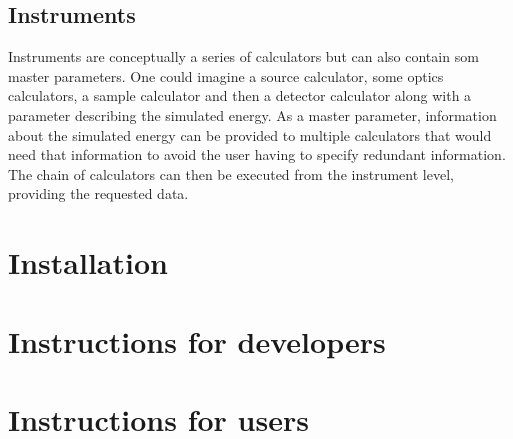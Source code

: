 \documentclass[10pt]{scrartcl}
\begin{document}
\subsection{Instruments}
\label{sec:instruments}
Instruments are conceptually a series of calculators but can also contain som
master parameters. One could imagine a source calculator, some optics
calculators, a sample calculator and then a detector calculator along with a
parameter describing the simulated energy. As a master parameter, information
about the simulated energy can be provided to multiple calculators that would
need that information to avoid the user having to specify redundant information.
The chain of calculators can then be executed from the instrument level,
providing the requested data.

\section{Installation}
\label{sec:installation}

\section{Instructions for developers}
\label{sec:dev}

\section{Instructions for users}
\label{sec:users}
\end{document}
